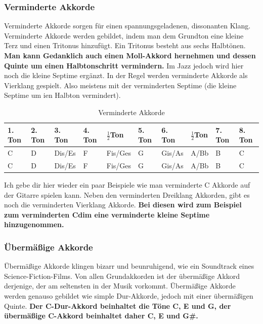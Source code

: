 \subsubsection{Verminderte Akkorde}
Verminderte Akkorde sorgen für einen spannungsgeladenen, dissonanten Klang. Verminderte Akkorde werden gebildet, indem man dem Grundton eine kleine Terz und einen Tritonus hinzufügt. Ein Tritonus besteht aus sechs Halbtönen. \textbf{Man kann Gedanklich auch einen Moll-Akkord hernehmen und dessen Quinte um einen Halbtonschritt vermindern.} Im Jazz jedoch wird hier noch die kleine Septime ergänzt. In der Regel werden verminderte Akkorde als Vierklang gespielt. Also meistens mit der verminderten Septime (die kleine Septime um ien Halbton vermindert). 

\begin{table}[H]
    \caption{Verminderte Akkorde}
    \scriptsize
    \begin{tabularx}{\textwidth}{|X|X|p{1.4cm}|X|p{1.4cm}|X|p{1.4cm}|p{1.4cm}|X|X|}
    \hline
    1. Ton & 2. Ton & 3. Ton & 4. Ton & $\frac{1}{2}$Ton & 5. Ton & 6. Ton & $\frac{1}{2}$Ton & 7. Ton & 8. Ton \\ \hline
    \cellcolor{gray!25}C & D & \cellcolor{gray!25}Dis/Es & F & \cellcolor{gray!25}Fis/Ges & G & Gis/As & A/Bb & B & C \\ \hline  
    \cellcolor{gray!25}C & D & \cellcolor{gray!25}Dis/Es & F & \cellcolor{gray!25}Fis/Ges & G & Gis/As & \cellcolor{gray!25}A/Bb & B & C \\ \hline  
    \end{tabularx}
\end{table}

Ich gebe dir hier wieder ein paar Beispiele wie man verminderte C Akkorde auf der Gitarre spielen kann. Neben den verminderten Dreiklang Akkorden, gibt es noch die verminderten Vierklang Akkorde. \textbf{Bei diesen wird zum Beispiel zum verminderten Cdim eine verminderte kleine Septime hinzugenommen.}




\subsubsection{Übermäßige Akkorde}
Übermäßige Akkorde klingen bizarr und beunruhigend, wie ein Soundtrack eines Science-Fiction-Films. Von allen Grundakkorden ist der übermäßige Akkord derjenige, der am seltensten in der Musik vorkommt. Übermäßige Akkorde werden genauso gebildet wie simple Dur-Akkorde, jedoch mit einer übermäßigen Quinte. \textbf{Der C-Dur-Akkord beinhaltet die Töne C, E und G, der übermäßige C-Akkord beinhaltet daher C, E und G\#.}

